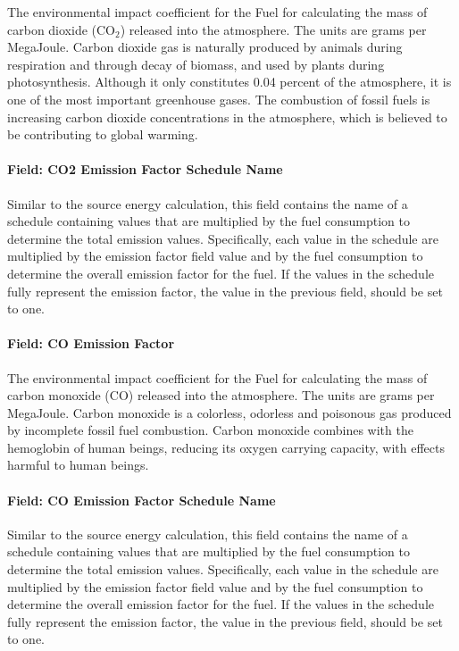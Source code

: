 The environmental impact coefficient for the Fuel for calculating the mass of carbon dioxide (CO\(_{2}\)) released into the atmosphere. The units are grams per MegaJoule. Carbon dioxide gas is naturally produced by animals during respiration and through decay of biomass, and used by plants during photosynthesis. Although it only constitutes 0.04 percent of the atmosphere, it is one of the most important greenhouse gases. The combustion of fossil fuels is increasing carbon dioxide concentrations in the atmosphere, which is believed to be contributing to global warming.

\paragraph{Field: CO2 Emission Factor Schedule Name}\label{field-co2-emission-factor-schedule-name}

Similar to the source energy calculation, this field contains the name of a schedule containing values that are multiplied by the fuel consumption to determine the total emission values. Specifically, each value in the schedule are multiplied by the emission factor field value and by the fuel consumption to determine the overall emission factor for the fuel. If the values in the schedule fully represent the emission factor, the value in the previous field, should be set to one.

\paragraph{Field: CO Emission Factor}\label{field-co-emission-factor}

The environmental impact coefficient for the Fuel for calculating the mass of carbon monoxide (CO) released into the atmosphere. The units are grams per MegaJoule. Carbon monoxide is a colorless, odorless and poisonous gas produced by incomplete fossil fuel combustion. Carbon monoxide combines with the hemoglobin of human beings, reducing its oxygen carrying capacity, with effects harmful to human beings.

\paragraph{Field: CO Emission Factor Schedule Name}\label{field-co-emission-factor-schedule-name}

Similar to the source energy calculation, this field contains the name of a schedule containing values that are multiplied by the fuel consumption to determine the total emission values. Specifically, each value in the schedule are multiplied by the emission factor field value and by the fuel consumption to determine the overall emission factor for the fuel. If the values in the schedule fully represent the emission factor, the value in the previous field, should be set to one.

